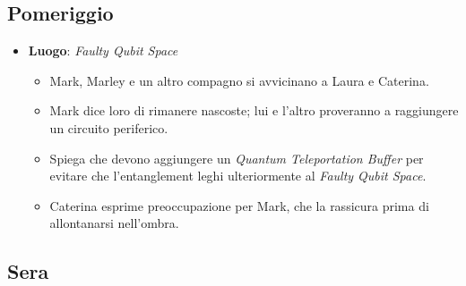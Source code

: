 \subsection*{Pomeriggio}

\begin{itemize}
    \item \textbf{Luogo}: \emph{Faulty Qubit Space}
    \begin{itemize}
        \item Mark, Marley e un altro compagno si avvicinano a Laura e Caterina.
        \item Mark dice loro di rimanere nascoste; lui e l'altro proveranno a raggiungere un circuito periferico.
        \item Spiega che devono aggiungere un \emph{Quantum Teleportation Buffer} per evitare che l'entanglement leghi ulteriormente al \emph{Faulty Qubit Space}.
        \item Caterina esprime preoccupazione per Mark, che la rassicura prima di allontanarsi nell'ombra.
    \end{itemize}
\end{itemize}

\subsection*{Sera}

